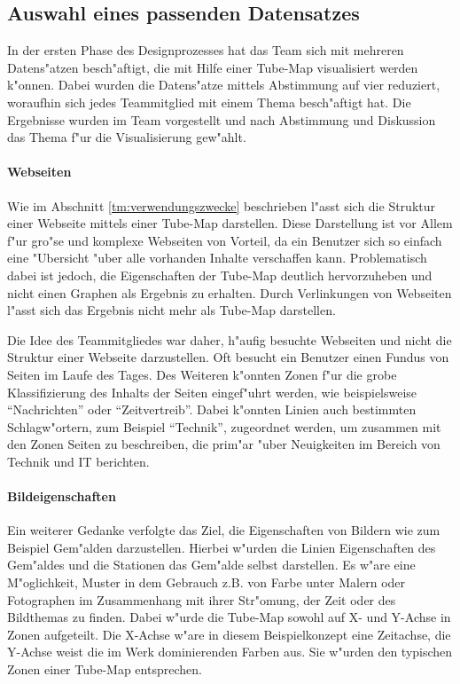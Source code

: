 
\subsection{Auswahl eines passenden Datensatzes}
In der ersten Phase des Designprozesses hat das Team sich mit mehreren Datens"atzen besch"aftigt, die mit Hilfe einer Tube-Map visualisiert werden k"onnen. Dabei wurden die Datens"atze mittels Abstimmung auf vier reduziert, woraufhin sich jedes Teammitglied mit einem Thema besch"aftigt hat. Die Ergebnisse wurden im Team vorgestellt und nach Abstimmung und Diskussion das Thema f"ur die Visualisierung gew"ahlt.

\paragraph{Webseiten}
Wie im Abschnitt \ref{tm:verwendungszwecke} beschrieben l"asst sich die Struktur einer Webseite mittels einer Tube-Map darstellen.  Diese Darstellung ist vor Allem f"ur gro"se und komplexe Webseiten von Vorteil, da ein Benutzer sich so einfach eine "Ubersicht "uber alle vorhanden Inhalte verschaffen kann. Problematisch dabei ist jedoch, die Eigenschaften der Tube-Map deutlich hervorzuheben und nicht einen Graphen als Ergebnis zu erhalten. Durch Verlinkungen von Webseiten l"asst sich das Ergebnis nicht mehr als Tube-Map darstellen.

Die Idee des Teammitgliedes war daher, h"aufig besuchte Webseiten und nicht die Struktur einer Webseite darzustellen. Oft besucht ein Benutzer einen Fundus von Seiten im Laufe des Tages. Des Weiteren k"onnten Zonen f"ur die grobe Klassifizierung des Inhalts der Seiten eingef"uhrt werden, wie beispielsweise "`Nachrichten"' oder "`Zeitvertreib"'. Dabei k"onnten Linien auch bestimmten Schlagw"ortern, zum Beispiel "`Technik"', zugeordnet werden, um zusammen mit den Zonen Seiten zu beschreiben, die prim"ar "uber Neuigkeiten im Bereich von Technik und IT berichten. 

\paragraph{Bildeigenschaften}
\label{dp:bildeigenschaften}
Ein weiterer Gedanke verfolgte das Ziel, die Eigenschaften von Bildern wie zum Beispiel Gem"alden darzustellen. Hierbei w"urden die Linien Eigenschaften des Gem"aldes und die Stationen das Gem"alde selbst darstellen. Es w"are eine M"oglichkeit, Muster in dem Gebrauch z.B. von Farbe unter Malern oder Fotographen im Zusammenhang mit ihrer Str"omung, der Zeit oder des Bildthemas zu finden. Dabei w"urde die Tube-Map sowohl auf X- und Y-Achse in Zonen aufgeteilt. Die X-Achse w"are in diesem Beispielkonzept eine Zeitachse, die Y-Achse weist die im Werk dominierenden Farben aus. Sie w"urden den typischen Zonen einer Tube-Map entsprechen.

